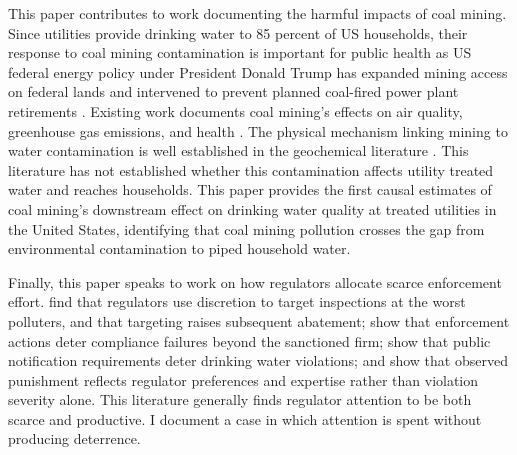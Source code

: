 \documentclass{article}
\begin{document}
This paper contributes to work documenting the harmful impacts of coal mining. Since utilities provide drinking water to 85 percent of US households, their response to coal mining contamination is important for public health as US federal energy policy under President Donald Trump has expanded mining access on federal lands and intervened to prevent planned coal-fired power plant retirements \parencite{Trump2025EO14260,Trump2025EO14261,Trump2025Proc10914,Daly2025CoalMining}. Existing work documents coal mining's effects on air quality, greenhouse gas emissions, and health \parencite{muller2011environmental,parfitt2024there}. The physical mechanism linking mining to water contamination is well established in the geochemical literature \parencite{skousen2019acid,akcil2006acid,ceto2000abandoned,rouhani2023overview,liang2017spatial,boente2020benzo}. This literature has not established whether this contamination affects utility treated water and reaches households. This paper provides the first causal estimates of coal mining's downstream effect on drinking water quality at treated utilities in the United States, identifying that coal mining pollution crosses the gap from environmental contamination to piped household water.

Finally, this paper speaks to work on how regulators allocate scarce enforcement effort. \textcite{duflo2018value} find that regulators use discretion to target inspections at the worst polluters, and that targeting raises subsequent abatement; \textcite{shimshack2005regulator} show that enforcement actions deter compliance failures beyond the sanctioned firm; \textcite{bennear2008impacts} show that public notification requirements deter drinking water violations; and \textcite{kang2021understanding} show that observed punishment reflects regulator preferences and expertise rather than violation severity alone. This literature generally finds regulator attention to be both scarce and productive. I document a case in which attention is spent without producing deterrence.

\end{document}

